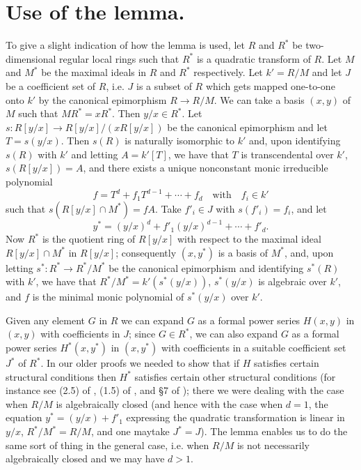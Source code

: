 \section{Use of the lemma.}\label{art01-sec3}

To give a slight indication of how the lemma is used, let $R$ and $R^{*}$ be two-dimensional regular local rings such that $R^{*}$ is a quadratic transform of $R$. Let $M$ and $M^{*}$ be the maximal ideals in $R$ and $R^{*}$ respectively. Let $k'=R/M$ and let $J$ be a coefficient set of $R$, i.e. $J$ is a subset of $R$ which gets mapped one-to-one onto $k'$ by the canonical epimorphism $R\to R/M$. We can take a basis $(x,y)$ of $M$ such that $MR^{*}=xR^{*}$. Then $y/x\in R^{*}$. Let $s:R[y/x]\to R[y/x]/(xR[y/x])$ be the canonical epimorphism and let $T=s(y/x)$. Then $s(R)$ is naturally isomorphic to $k'$ and, upon identifying $s(R)$ with $k'$ and letting $A=k'[T]$, we have that $T$ is transcendental over $k'$, $s(R[y/x])=A$, and there exists a unique nonconstant monic irreducible polynomial
$$
f=T^{d}+f_{1}T^{d-1}+\cdots+f_{d}\text{~~ with~~ } f_{i}\in k'
$$
such that $s(R[y/x]\cap M^{*})=fA$. Take $f'_{i}\in J$ with $s(f'_{i})=f_{i}$, and let 
$$
y^{*}=(y/x)^{d}+f'_{1}(y/x)^{d-1}+\cdots+f'_{d}.
$$
Now $R^{*}$ is the quotient ring of $R[y/x]$ with respect to the maximal ideal $R[y/x]\cap M^{*}$ in $R[y/x]$; consequently $(x,y^{*})$ is a basis of $M^{*}$, and, upon letting $s^{*}:R^{*}\to R^{*}/M^{*}$ be the canonical epimorphism and identifying $s^{*}(R)$ with $k'$, we have that $R^{*}/M^{*}=k'(s^{*}(y/x))$, $s^{*}(y/x)$ is algebraic over $k'$, and $f$ is the minimal monic polynomial of $s^{*}(y/x)$ over $k'$.

Given any element $G$ in $R$ we can expand $G$ as a formal power series $H(x,y)$ in $(x,y)$ with coefficients in $J$; since $G\in R^{*}$, we can also expand $G$ as a formal power series $H^{*}(x,y^{*})$ in $(x,y^{*})$ with coefficients in a suitable coefficient set $J^{*}$ of $R^{*}$. In our older proofs we needed to show that if $H$ satisfies certain structural conditions then $H^{*}$ satisfies certain other structural conditions (for instance see (2.5) of \cite{art01-key4}, (1.5) of \cite{art01-key5}, and \S7 of \cite{art01-key11}); there we were dealing with the case when $R/M$ is algebraically closed (and hence with the case when $d=1$, the equation $y^{*}=(y/x)+f'_{1}$ expressing the quadratic transformation is linear in $y/x$, $R^{*}/M^{*}=R/M$, and one may\pageoriginale take $J^{*}=J$). The lemma enables us to do the same sort of thing in the general case, i.e. when $R/M$ is not necessarily algebraically closed and we may have $d>1$.

